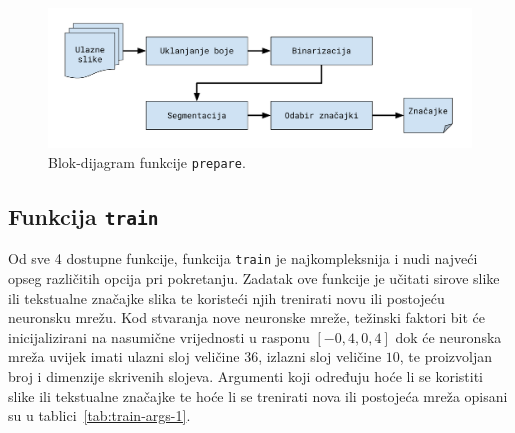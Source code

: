 \begin{figure}[htb]
    \centering
    \includegraphics[width=12cm]{images/chapter4/prepare-diagram.pdf}
    \caption{Blok-dijagram funkcije \texttt{prepare}.}
    \label{fig:prepare-diagram}
\end{figure}

\subsection{Funkcija \texttt{train}}
\label{subsec:funkcija-train}
Od sve 4 dostupne funkcije, funkcija \texttt{train} je najkompleksnija i nudi najveći opseg različitih opcija pri
pokretanju. Zadatak ove funkcije je učitati sirove slike ili tekstualne značajke slika te koristeći njih trenirati
novu ili postojeću neuronsku mrežu. Kod stvaranja nove neuronske mreže, težinski faktori bit će inicijalizirani na
nasumične vrijednosti u rasponu $[-0,4, 0,4]$ dok će neuronska mreža uvijek imati ulazni sloj veličine $36$, izlazni
sloj veličine $10$, te proizvoljan broj i dimenzije skrivenih slojeva. Argumenti koji određuju hoće li se koristiti
slike ili tekstualne značajke te hoće li se trenirati nova ili postojeća mreža opisani su u
tablici\ \ref{tab:train-args-1}.
